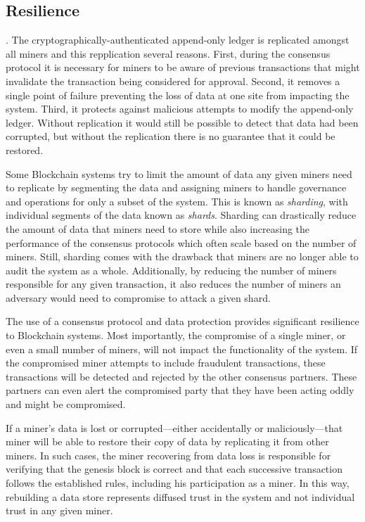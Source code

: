 \subsection{Resilience}
.
The cryptographically-authenticated append-only ledger is replicated amongst all miners and this repplication several reasons.
First, during the consensus protocol it is necessary for miners to be aware of previous transactions that might invalidate the transaction being considered for approval.
Second, it removes a single point of failure preventing the loss of data at one site from impacting the system.
Third, it protects against malicious attempts to modify the append-only ledger. Without replication it would still be possible to detect that data had been corrupted, but without the replication there is no guarantee that it could be restored.

Some Blockchain systems try to limit the amount of data any given miners need to replicate by segmenting the data and assigning miners to handle governance and operations for only a subset of the system.
This is known as \emph{sharding}, with individual segments of the data known as \emph{shards}.
Sharding can drastically reduce the amount of data that miners need to store while also increasing the performance of the consensus protocols which often scale based on the number of miners.
Still, sharding comes with the drawback that miners are no longer able to audit the system as a whole.
Additionally, by reducing the number of miners responsible for any given transaction, it also reduces the number of miners an adversary would need to compromise to attack a given shard.

The use of a consensus protocol and data protection provides significant resilience to Blockchain systems.
Most importantly, the compromise of a single miner, or even a small number of miners, will not impact the functionality of the system.
If the compromised miner attempts to include fraudulent transactions, these transactions will be detected and rejected by the other consensus partners.
These partners can even alert the compromised party that they have been acting oddly and might be compromised.

If a miner's data is lost or corrupted---either accidentally or maliciously---that miner will be able to restore their copy of data by replicating it from other miners.
In such cases, the miner recovering from data loss is responsible for verifying that the genesis block is correct and that each successive transaction follows the established rules, including his participation as a miner.
In this way, rebuilding a data store represents diffused trust in the system and not individual trust in any given miner.

